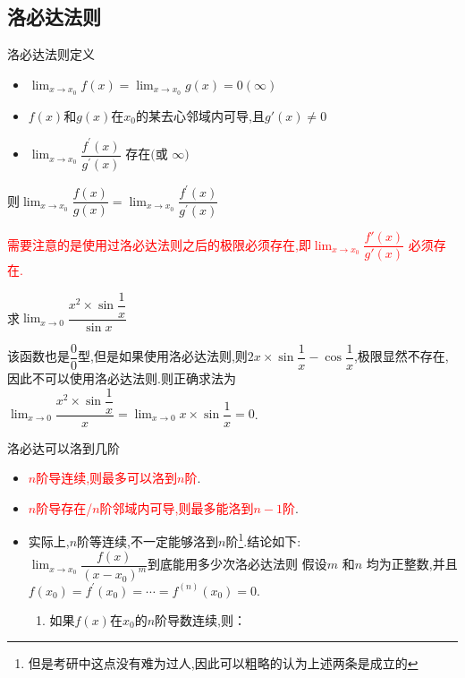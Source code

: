 \documentclass[8pt a4paper, oneside, UTF8]{ctexbook}
\begin{document}
\begin{sloppypar}
    \subsection{洛必达法则}
    \begin{defn}{洛必达法则定义}{}
        \begin{itemize}
            \item $\lim_{x\to x_0}f(x)=\lim_{x\to x_0}g(x)=0(\infty)$
            \item $f(x)$和$g(x)$在$x_0$的某去心邻域内可导,且$g'(x) \neq 0$
            \item $\lim_{x\to x_0}\dfrac{f^{\prime}(x)}{g^{\prime}(x)}\text{ 存在(或 }\infty)$
        \end{itemize}
        则$\lim_{x\to x_{0}}\dfrac{f(x)}{g(x)}=\lim_{x\to x_{0}}\dfrac{f^{'}(x)}{g^{'}(x)}$
    \end{defn}
    \textcolor{red}{需要注意的是使用过洛必达法则之后的极限必须存在,即$\lim _{x \to x_0}\dfrac{f'(x)}{g'(x)}$ 必须存在.}
    \begin{problem}
    求$\lim _{x \to 0}\dfrac{x^2 \times \sin \dfrac{1}{x}}{\sin x}$
    \end{problem}
    \begin{solution}
        该函数也是$\dfrac{0}{0}$型,但是如果使用洛必达法则,则$2x \times \sin \dfrac{1}{x}-\cos \dfrac{1}{x}$,极限显然不存在,因此不可以使用洛必达法则.则正确求法为$\lim _{x\to 0}\dfrac{x^2\times \sin \dfrac{1}{x}}{x}=\lim_{x\to 0}x\times\sin\dfrac{1}{x}=0$.
    \end{solution}
    \begin{conclusion}{洛必达可以洛到几阶}{}
        \begin{itemize}
            \item \textcolor{red}{$n$阶导连续,则最多可以洛到$n$阶}.
            \item \textcolor{red}{$n$阶导存在/$n$阶邻域内可导,则最多能洛到$n-1$阶}.
            \item 实际上,$n$阶等连续,不一定能够洛到$n$阶\footnote{但是考研中这点没有难为过人,因此可以粗略的认为上述两条是成立的}.结论如下:\\
                  $\lim_{x\to x_0}\dfrac{f(x)}{\left(x-x_0\right)^m}$到底能用多少次洛必达法则
                  假设$m$ 和$n$ 均为正整数,并且 $f(x_0)=f^{\prime}(x_0)=\cdots=f^{(n)}(x_0)=0.$
                  \begin{enumerate}
                      \item 如果$f(x)$在$x_0$的$n$阶导数连续,则：
                            \begin{enumerate}

\end{enumerate}
\end{enumerate}
\end{itemize}
\end{conclusion}
\end{sloppypar}
\end{document}
